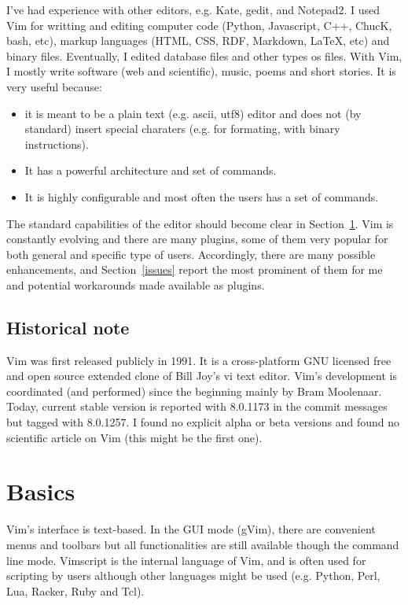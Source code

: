 \documentclass{article}
\begin{document}
I've had experience with other editors, e.g. Kate, gedit, and Notepad2.
I used Vim for writting and editing computer code (Python, Javascript, C++, ChucK, bash, etc), markup languages (HTML, CSS, RDF, Markdown, \LaTeX, etc) and binary files.
Eventually, I edited database files and other types os files.
With Vim, I mostly write software (web and scientific),
music, poems and short stories.
It is very useful because:
\begin{itemize}
  \item it is meant to be a plain text (e.g. ascii, utf8) editor
  and does not (by standard) insert special charaters (e.g. for formating, with binary instructions).
  \item It has a powerful architecture and set of commands.
  \item It is highly configurable and most often the users
  has a set of commands.
\end{itemize}

The standard capabilities of the editor
should become clear in Section~\ref{basics}.
Vim is constantly evolving and there are many plugins,
some of them very popular for both general and specific
type of users.
Accordingly, there are many possible enhancements,
and Section~\ref{issues} report the most prominent of them
for me and potential workarounds made available as plugins.

\subsection{Historical note}
Vim was first released publicly in 1991.
It is a cross-platform GNU licensed free and open source extended clone of Bill Joy's vi text editor.
Vim's development is coordinated (and performed) since the beginning
mainly by Bram Moolenaar.
Today, current stable version is reported with 8.0.1173
in the commit messages but tagged with 8.0.1257.
I found no explicit alpha or beta versions
and found no scientific article on Vim (this might be the first one).

\section{Basics}\label{basics}
Vim's interface is text-based.
In the GUI mode (gVim),
there are convenient menus and toolbars
but all functionalities are still available though
the command line mode.
Vimscript is the internal language of Vim,
and is often used for scripting by users
although other languages might be used 
(e.g. Python, Perl, Lua, Racker, Ruby and Tcl). 
\end{document}
